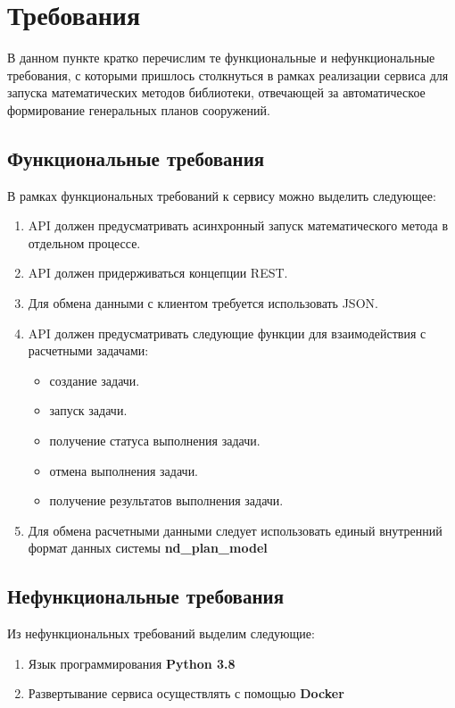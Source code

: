 \section*{\Large{Требования}}

В данном пункте кратко перечислим те функциональные и нефункциональные требования, с которыми пришлось столкнуться
в рамках реализации сервиса для запуска математических методов библиотеки, отвечающей за автоматическое формирование
генеральных планов сооружений.

\subsection*{\large{Функциональные требования}}

В рамках функциональных требований к сервису можно выделить следующее:
\begin{enumerate}
    \item API должен предусматривать асинхронный запуск математического метода в отдельном процессе.
    \item API должен придерживаться концепции REST.
    \item Для обмена данными с клиентом требуется использовать JSON.
    \item API должен предусматривать следующие функции для взаимодействия с расчетными задачами:
    \begin{itemize}
        \item создание задачи.
        \item запуск задачи.
        \item получение статуса выполнения задачи.
        \item отмена выполнения задачи.
        \item получение результатов выполнения задачи.
    \end{itemize}
    \item Для обмена расчетными данными следует использовать единый внутренний формат данных системы \textbf{nd\_plan\_model}

\end{enumerate}

\subsection*{\large{Нефункциональные требования}}

Из нефункциональных требований выделим следующие:
\begin{enumerate}
    \item Язык программирования \textbf{Python 3.8}
    \item Развертывание сервиса осуществлять с помощью \textbf{Docker}
\end{enumerate}
